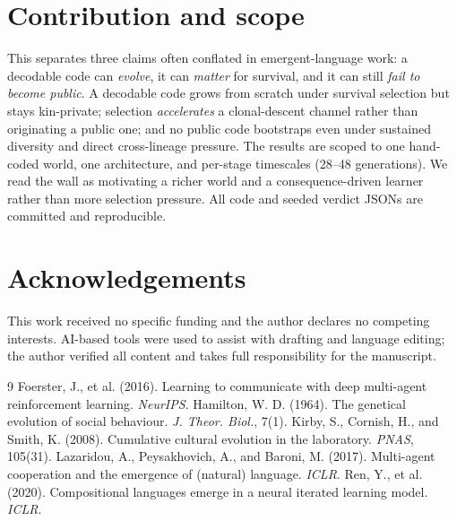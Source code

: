 \documentclass[letterpaper]{article}
\begin{document}
\section{Contribution and scope}
This separates three claims often conflated in emergent-language work: a decodable code can
\emph{evolve}, it can \emph{matter} for survival, and it can still \emph{fail to become
public}. A decodable code grows from scratch under survival selection but stays kin-private;
selection \emph{accelerates} a clonal-descent channel rather than originating a public one; and
no public code bootstraps even under sustained diversity and direct cross-lineage pressure. The results
are scoped to one hand-coded world, one architecture, and per-stage timescales (28--48
generations). We read the wall as motivating a richer world and a consequence-driven learner
rather than more selection pressure. All code and seeded verdict JSONs are committed and
reproducible.

\section*{Acknowledgements}
This work received no specific funding and the author declares no competing interests. AI-based tools were used to assist with drafting and language editing; the author verified all content and takes full responsibility for the manuscript.

\FloatBarrier
\footnotesize
\begin{thebibliography}{9}
\setlength{\itemsep}{0pt}
 Foerster, J., et al. (2016). Learning to communicate with deep multi-agent reinforcement learning. \emph{NeurIPS}.
 Hamilton, W. D. (1964). The genetical evolution of social behaviour. \emph{J. Theor. Biol.}, 7(1).
 Kirby, S., Cornish, H., and Smith, K. (2008). Cumulative cultural evolution in the laboratory. \emph{PNAS}, 105(31).
 Lazaridou, A., Peysakhovich, A., and Baroni, M. (2017). Multi-agent cooperation and the emergence of (natural) language. \emph{ICLR}.
 Ren, Y., et al. (2020). Compositional languages emerge in a neural iterated learning model. \emph{ICLR}.
\end{thebibliography}
\end{document}
